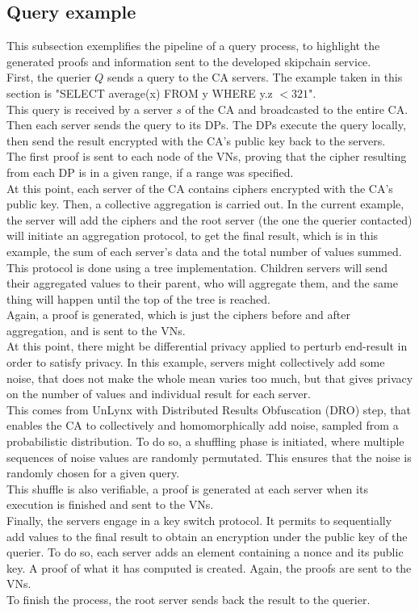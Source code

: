 \documentclass{article}
\begin{document}
\subsection{Query example}
This subsection exemplifies the pipeline of a query process, to highlight the generated proofs and information sent to the developed skipchain service.\\
First, the querier $Q$ sends a query to the CA servers. The example taken in this section is "SELECT average(x) FROM y WHERE y.z $< 321$".\\
This query is received by a server $s$ of the CA and broadcasted to the entire CA. Then each server sends the query to its DPs. The DPs execute the query locally, then send the result encrypted with the CA's public key back to the servers.\\
The first proof is sent to each node of the VNs, proving that the cipher resulting from each DP is in a given range, if a range was specified.\\
At this point, each server of the CA contains ciphers encrypted with the CA's public key.
Then, a collective aggregation is carried out. In the current example, the server will add the ciphers and the root server (the one the querier contacted) will initiate an aggregation protocol, to get the final result, which is in this example, the sum of each server's data and the total number of values summed. This protocol is done using a tree implementation. Children servers will send their aggregated values to their parent, who will aggregate them, and the same thing will happen until the top of the tree is reached.\\
Again, a proof is generated, which is just the ciphers before and after aggregation, and is sent to the VNs.\\
At this point, there might be differential privacy applied to perturb end-result in order to satisfy privacy. In this example, servers might collectively add some noise, that does not make the whole mean varies too much, but that gives privacy on the number of values and individual result for each server.\\
This comes from UnLynx with Distributed Results Obfuscation (DRO) step, that enables the CA to collectively and homomorphically add noise, sampled from a probabilistic distribution.
To do so, a shuffling phase is initiated, where multiple sequences of noise values are randomly permutated. This ensures that the noise is randomly chosen for a given query.\\
This shuffle is also verifiable, a proof is generated at each server when its execution is finished and sent to the VNs.\\
Finally, the servers engage in a key switch protocol. It permits to sequentially add values to the final result to obtain an encryption under the public key of the querier. To do so, each server adds an element containing a nonce and its public key. A  proof of what it has computed is created. Again, the proofs are sent to the VNs.\\
To finish the process, the root server sends back the result to the querier.\\
\end{document}
